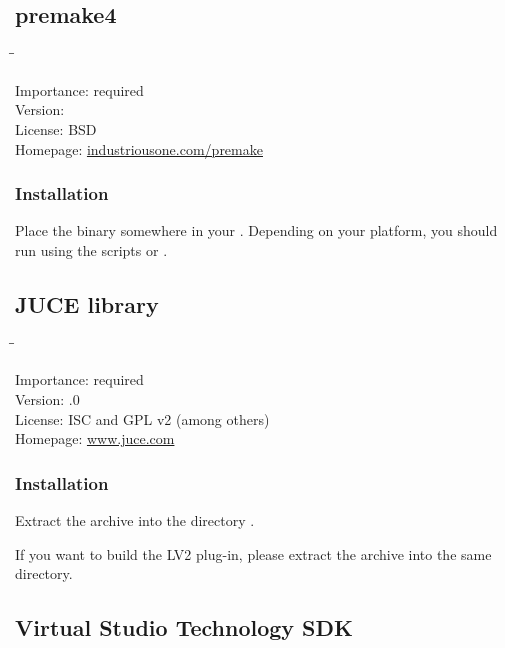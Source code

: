 \subsection{premake4}

\begin{tabbing}
  \hspace*{6em}\=\=\kill

  Importance:  \> required \\
  Version:      \\
  License:     \> BSD \\
  Homepage:    \> \href{http://industriousone.com/premake}{industriousone.com/premake}
\end{tabbing}

\subsubsection{Installation}

Place the binary somewhere in your .  Depending on your
platform, you should run  using the scripts
 or .

\subsection{JUCE library}

\begin{tabbing}
  \hspace*{6em}\=\=\kill

  Importance:  \> required \\
  Version:     .0 \\
  License:     \> ISC and GPL v2 (among others) \\
  Homepage:    \> \href{http://www.juce.com/}{www.juce.com}
\end{tabbing}

\subsubsection{Installation}

Extract the archive into the directory .

If you want to build the LV2 plug-in, please extract the archive
 into the same directory.

\subsection{Virtual Studio Technology SDK}

